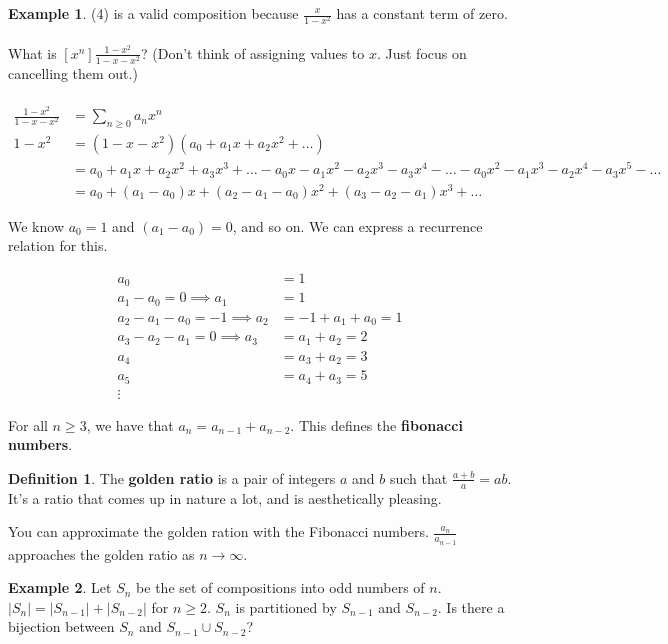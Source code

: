 \documentclass[]{article}
\theoremstyle{definition}
\newtheorem{defn}{Definition}[section]
\newtheorem{ex}{Example}[section]
\begin{document}
\begin{ex}
					(4) is a valid composition because $\frac{x}{1 - x^2}$ has a constant term of zero.
					\\ \\
					What is $[x^n] \frac{1 - x^2}{1 - x - x^2}$? (Don't think of assigning values to $x$. Just focus on cancelling them out.)
					\\ \\
					\begin{align*}
						\frac{1 - x^2}{1 - x - x^2} &= \sum_{n \ge 0} a_n x^n \\
						1 - x^2 &= (1 - x - x^2)(a_0 + a_1x + a_2x^2 + \ldots) \\
						&= a_0 + a_1x + a_2x^2 + a_3x^3 + \ldots - a_0x -a_1x^2 - a_2x^3 - a_3x^4 - \ldots -a_0x^2 - a_1x^3 - a_2x^4 - a_3x^5 - \ldots \\
						&= a_0 + (a_1 - a_0)x + (a_2 - a_1 - a_0)x^2 + (a_3 - a_2 - a_1)x^3 + \ldots
					\end{align*}

					We know $a_0 = 1$ and $(a_1 - a_0) = 0$, and so on. We can express a recurrence relation for this.
					
					\begin{align*}
						a_0 &= 1 \\
						a_1 - a_0 = 0 \implies a_1 &= 1 \\
						a_2 - a_1 - a_0 = -1 \implies a_2 &= -1 + a_1 + a_0 = 1 \\
						a_3 - a_2 - a_1 = 0 \implies a_3 &= a_1 + a_2 = 2 \\
						a_4 &= a_3 + a_2 = 3 \\
						a_5 &= a_4 + a_3 = 5 \\
						\vdots&
					\end{align*}

					For all $n \ge 3$, we have that $a_n = a_{n - 1} + a_{n - 2}$. This defines the \textbf{fibonacci numbers}.
				\end{ex}
				
				\begin{defn}
					The \textbf{golden ratio} is a pair of integers $a$ and $b$ such that $\frac{a + b}{a} = {a}{b}$. It's a ratio that comes up in nature a lot, and is aesthetically pleasing.
				\end{defn}

				You can approximate the golden ration with the Fibonacci numbers. $\frac{a_n}{a_{n - 1}}$ approaches the golden ratio as $n \to \infty$.
				
				\begin{ex}
					Let $S_n$ be the set of compositions into odd numbers of $n$. $|S_n| = |S_{n - 1}| + |S_{n - 2}|$ for $n \ge 2$. $S_n$ is partitioned by $S_{n - 1}$ and $S_{n - 2}$. Is there a bijection between $S_n$ and $S_{n - 1} \cup S_{n - 2}$?
				\end{ex}
		
\end{document}
